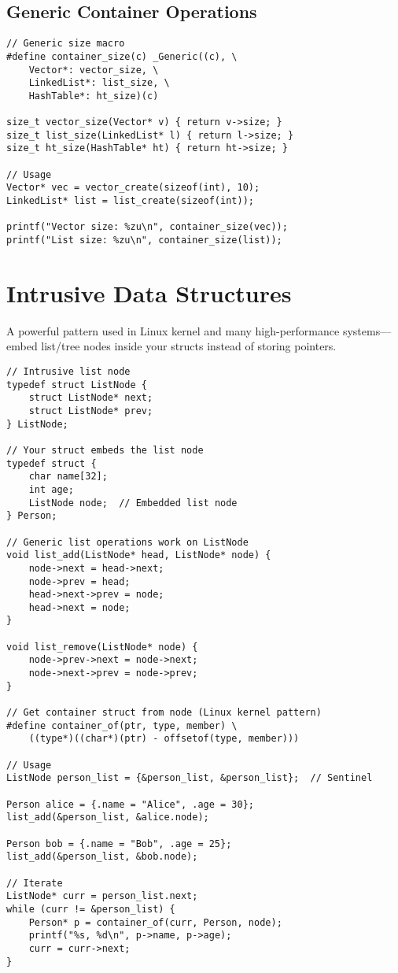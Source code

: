 \subsection{Generic Container Operations}

\begin{lstlisting}
// Generic size macro
#define container_size(c) _Generic((c), \
    Vector*: vector_size, \
    LinkedList*: list_size, \
    HashTable*: ht_size)(c)

size_t vector_size(Vector* v) { return v->size; }
size_t list_size(LinkedList* l) { return l->size; }
size_t ht_size(HashTable* ht) { return ht->size; }

// Usage
Vector* vec = vector_create(sizeof(int), 10);
LinkedList* list = list_create(sizeof(int));

printf("Vector size: %zu\n", container_size(vec));
printf("List size: %zu\n", container_size(list));
\end{lstlisting}

\section{Intrusive Data Structures}

A powerful pattern used in Linux kernel and many high-performance systems—embed list/tree nodes inside your structs instead of storing pointers.

\begin{lstlisting}
// Intrusive list node
typedef struct ListNode {
    struct ListNode* next;
    struct ListNode* prev;
} ListNode;

// Your struct embeds the list node
typedef struct {
    char name[32];
    int age;
    ListNode node;  // Embedded list node
} Person;

// Generic list operations work on ListNode
void list_add(ListNode* head, ListNode* node) {
    node->next = head->next;
    node->prev = head;
    head->next->prev = node;
    head->next = node;
}

void list_remove(ListNode* node) {
    node->prev->next = node->next;
    node->next->prev = node->prev;
}

// Get container struct from node (Linux kernel pattern)
#define container_of(ptr, type, member) \
    ((type*)((char*)(ptr) - offsetof(type, member)))

// Usage
ListNode person_list = {&person_list, &person_list};  // Sentinel

Person alice = {.name = "Alice", .age = 30};
list_add(&person_list, &alice.node);

Person bob = {.name = "Bob", .age = 25};
list_add(&person_list, &bob.node);

// Iterate
ListNode* curr = person_list.next;
while (curr != &person_list) {
    Person* p = container_of(curr, Person, node);
    printf("%s, %d\n", p->name, p->age);
    curr = curr->next;
}
\end{lstlisting}

